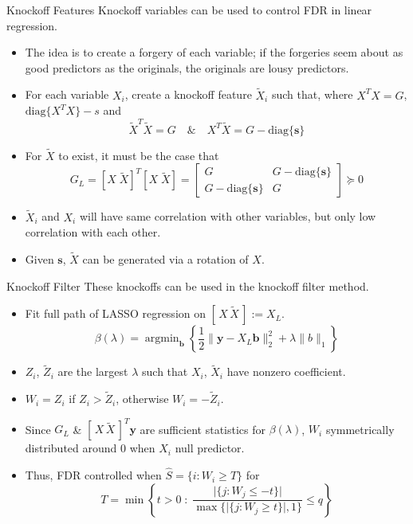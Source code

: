 \documentclass{beamer}
\newcommand{\diag}[1]{\mathrm{diag}\{#1\}}
\DeclareMathOperator*{\argmin}{arg\min}
\begin{document}
\begin{frame}{Knockoff Features}
    Knockoff variables can be used to control FDR in linear regression. 
    \begin{itemize}
        \item The idea is to create a forgery of each variable; if the forgeries seem about as good predictors as the originals, the originals are lousy predictors.
        \item For each variable $X_i$, create a knockoff feature $\tilde X_i$ such that, where $X^TX=G$, $\diag{X^T X} - s$ and 
            \[ \tilde X^T \tilde X = G \quad \& \quad X^T \tilde X = G - \diag{\mathbf s} \]
        \item For $\tilde X$ to exist, it must be the case that
            \[ G_L =[X\; \tilde X]^T[X\; \tilde X] = \left[ \begin{array}{cc} G & G - \diag{\mathbf s} \\ G - \diag{\mathbf s} & G \end{array}\right] \succeq 0 \]
        \item $\tilde X_i$ and $X_i$ will have same correlation with other variables, but only low correlation with each other.
        \item Given $\mathbf s$, $\tilde X$ can be generated via a rotation of $X$.
    \end{itemize}
\end{frame}

\begin{frame}{Knockoff Filter}
    These knockoffs can be used in the knockoff filter method. 
    \begin{itemize}
        \item Fit full path of LASSO regression on $[\,X\,\tilde X\,]:=X_L$.
    \[ \beta(\lambda) = \argmin_\mathbf b \left\{\frac{1}{2}\|\mathbf y - X_L\mathbf b\|^2_2 + \lambda\|b\|_1 \right\}\]
        \item $Z_i$, $\tilde Z_i$ are the largest $\lambda$ such that $X_i$, $\tilde X_i$ have nonzero coefficient.
        \item $W_i= Z_i$ if $Z_i>\tilde Z_i$, otherwise $W_i = -\tilde Z_i$.
        \item Since $G_L$ \& $[\, X \, \tilde X\,]^T\mathbf y$ are sufficient statistics for $\beta(\lambda)$, $W_i$ symmetrically distributed around $0$ when $X_i$ null predictor.
        \item Thus, FDR controlled when $\hat S = \{i:W_i\geq T\}$ for 
            \[ T = \min\left\{ t>0 \;: \; \frac{\vert\{j:W_j\leq -t\}\vert}{\max\{\vert\{j:W_j\geq t\}\vert,1\}}\leq q \right\} \]
    \end{itemize}
\end{frame}
\end{document}
